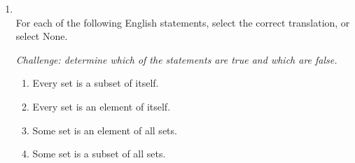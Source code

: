 \documentclass[12pt, oneside]{article}
\begin{document}
\begin{enumerate}
\begin{enumerate}
\begin{enumerate}
    \item First approach, assumption.
    \item First approach, ``need to show".
    \item Second approach, assumption.
    \item Second approach, ``need to show".
\end{enumerate}

Pick an option from below for the assumption and ``need to show" in each approach.


\begin{multicols}{2}
\begin{enumerate}[label=(\roman*)]
\item $\forall X ( X \subseteq A \leftrightarrow X \subseteq B)$
\item $\exists X ( X \subseteq A \leftrightarrow X \subseteq B)$
\item $\forall X ( X \subseteq A \oplus X \subseteq B)$
\item $\exists X ( X \subseteq A \oplus X \subseteq B)$
\item $\forall x ( x \in A \leftrightarrow x \in B)$
\item $\exists x ( x \in A \leftrightarrow x \in B)$
\item $\forall x ( x \in A \oplus x \in B)$
\item $\exists x ( x \in A \oplus x \in B)$
\end{enumerate}
\end{multicols}     \item \hspace{1in}\\ 

For each of the following English statements, select
the correct translation, or select None.

{\it Challenge: determine which of the statements are true and which 
are false.}

\begin{enumerate}
\item Every set is a subset of itself.

\item Every set is an element of itself.

\item Some set is an element of all sets.

\item Some set is a subset of all sets.
\end{enumerate}


\end{enumerate}
\end{enumerate}
\end{document}
